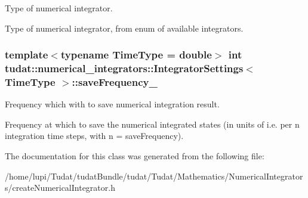 Type of numerical integrator. 

Type of numerical integrator, from enum of available integrators. 
\subsubsection[{\texorpdfstring{save\+Frequency\+\_\+}{saveFrequency_}}]{\setlength{\rightskip}{0pt plus 5cm}template$<$typename Time\+Type  = double$>$ int {\bf tudat\+::numerical\+\_\+integrators\+::\+Integrator\+Settings}$<$ Time\+Type $>$\+::save\+Frequency\+\_\+}\hypertarget{classtudat_1_1numerical__integrators_1_1IntegratorSettings_a6d823e9354ad993a0605cf28fa85dd8b}{}\label{classtudat_1_1numerical__integrators_1_1IntegratorSettings_a6d823e9354ad993a0605cf28fa85dd8b}


Frequency which with to save numerical integration result. 

Frequency at which to save the numerical integrated states (in units of i.\+e. per n integration time steps, with n = save\+Frequency). 

The documentation for this class was generated from the following file\+:\begin{DoxyCompactItemize}
\item 
/home/lupi/\+Tudat/tudat\+Bundle/tudat/\+Tudat/\+Mathematics/\+Numerical\+Integrators/create\+Numerical\+Integrator.\+h\end{DoxyCompactItemize}
